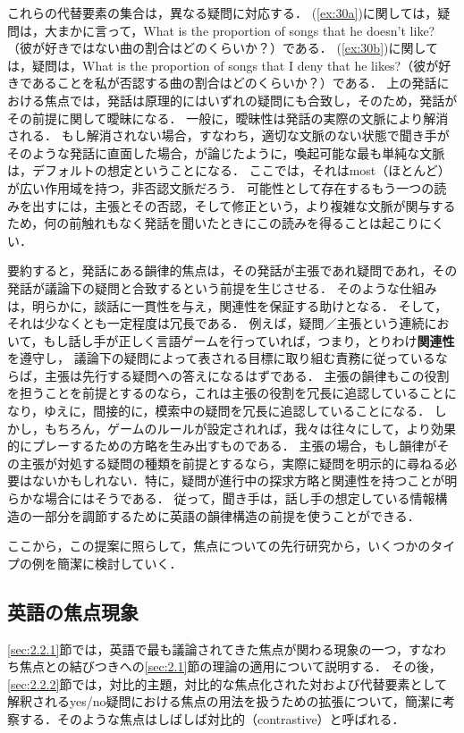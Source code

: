 \documentclass{goken}
\newcommand{\term}[2]{\textsf{#1}（#2）}
\newcommand{\ori}[1]{\noindent\textcolor[gray]{0.7}{\fontsize{8pt}{8pt}\selectfont{\textsf{(p.~#1)}}} }
\begin{document}
\noindent
これらの代替要素の集合は，異なる疑問に対応する．
(\ref{ex:30a})に関しては，疑問は，大まかに言って，What is the proportion of songs that he doesn't like?（彼が好きではない曲の割合はどのくらいか？）である．
(\ref{ex:30b})に関しては，疑問は，What is the proportion of songs that I deny that he likes?（彼が好きであることを私が否認する曲の割合はどのくらいか？）である．
上の発話における焦点では，発話は原理的にはいずれの疑問にも合致し，そのため，発話がその前提に関して曖昧になる．
一般に，曖昧性は発話の実際の文脈により解消される．
もし解消されない場合，すなわち，適切な文脈のない状態で聞き手がそのような発話に直面した場合，\citet{KadmonRoberts1986}が論じたように，喚起可能な最も単純な文脈は，デフォルトの想定ということになる．
ここでは，それはmost（ほとんど）が広い作用域を持つ，非否認文脈だろう．
可能性として存在するもう一つの読みを出すには，主張とその否認，そして修正という，より複雑な文脈が関与するため，何の前触れもなく発話を聞いたときにこの読みを得ることは起こりにくい．

要約すると，発話にある韻律的焦点は，その発話が主張であれ疑問であれ，その発話が議論下の疑問と合致するという前提を生じさせる．
そのような仕組みは，明らかに，談話に一貫性を与え，関連性を保証する助けとなる．
そして，それは少なくとも一定程度は冗長である．
例えば，疑問／主張という連続において，もし話し手が正しく言語ゲームを行っていれば，つまり，とりわけ\textbf{関連性}を遵守し，\ori{36}議論下の疑問によって表される目標に取り組む責務に従っているならば，主張は先行する疑問への答えになるはずである．
主張の韻律もこの役割を担うことを前提とするのなら，これは主張の役割を冗長に追認していることになり，ゆえに，間接的に，模索中の疑問を冗長に追認していることになる．
しかし，もちろん，ゲームのルールが設定されれば，我々は往々にして，より効果的にプレーするための方略を生み出すものである．
主張の場合，もし韻律がその主張が対処する疑問の種類を前提とするなら，実際に疑問を明示的に尋ねる必要はないかもしれない．特に，疑問が進行中の探求方略と関連性を持つことが明らかな場合にはそうである．
従って，聞き手は，話し手の想定している情報構造の一部分を調節するために英語の韻律構造の前提を使うことができる．

ここから，この提案に照らして，焦点についての先行研究から，いくつかのタイプの例を簡潔に検討していく．

\subsection{英語の焦点現象}\label{sec:2.2}

\ref{sec:2.2.1}節では，英語で最も議論されてきた焦点が関わる現象の一つ，すなわち焦点との結びつきへの\ref{sec:2.1}節の理論の適用について説明する．
その後，\ref{sec:2.2.2}節では，対比的主題，対比的な焦点化された対および代替要素として解釈されるyes/no疑問における焦点の用法を扱うための拡張について，簡潔に考察する．そのような焦点はしばしば\term{対比的}{contrastive}と呼ばれる．
\end{document}
